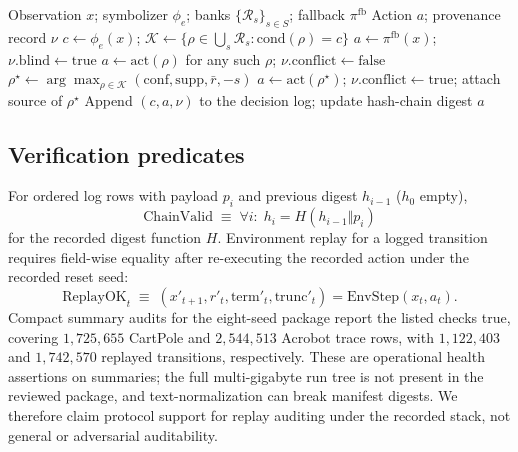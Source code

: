 \documentclass[11pt,a4paper]{article}
\begin{document}
\begin{algorithm}[t]
\caption{Rule-fusion decision at a state (academic symbols only)}
\label{alg:fusion}
\begin{algorithmic}[1]
\Require Observation \(x\); symbolizer \(\phi_e\); banks \(\{\mathcal{R}_s\}_{s\in S}\); fallback \(\pi^{\mathrm{fb}}\)
\Ensure Action \(a\); provenance record \(\nu\)
\State \(c\leftarrow\phi_e(x)\); \(\mathcal{K}\leftarrow\{\rho\in\bigcup_s\mathcal{R}_s:\mathrm{cond}(\rho)=c\}\)
  \State \(a\leftarrow\pi^{\mathrm{fb}}(x)\); \(\nu.\mathrm{blind}\leftarrow\mathrm{true}\)
  \State \(a\leftarrow\mathrm{act}(\rho)\) for any such \(\rho\); \(\nu.\mathrm{conflict}\leftarrow\mathrm{false}\)
\Else
  \State \(\rho^\star\leftarrow\arg\max_{\rho\in\mathcal{K}}(\mathrm{conf},\mathrm{supp},\bar r,-s)\)
  \State \(a\leftarrow\mathrm{act}(\rho^\star)\); \(\nu.\mathrm{conflict}\leftarrow\mathrm{true}\); attach source of \(\rho^\star\)
\EndIf
\State Append \((c,a,\nu)\) to the decision log; update hash-chain digest
\State \Return \(a\)
\end{algorithmic}
\end{algorithm}

\subsection{Verification predicates}
\label{sec:verify}

For ordered log rows with payload \(p_i\) and previous digest \(h_{i-1}\) (\(h_0\) empty),
\begin{equation}
\label{eq:chain}
\mathrm{ChainValid}
\;\equiv\;
\forall i:\; h_i=H(h_{i-1}\Vert p_i)
\end{equation}
for the recorded digest function \(H\).
Environment replay for a logged transition requires field-wise equality after re-executing the recorded action under the recorded reset seed:
\begin{equation}
\label{eq:replay}
\mathrm{ReplayOK}_t
\;\equiv\;
(x'_{t+1},r'_t,\mathrm{term}'_t,\mathrm{trunc}'_t)
=\mathrm{EnvStep}(x_t,a_t).
\end{equation}
Compact summary audits for the eight-seed package report the listed checks true, covering \(1{,}725{,}655\) CartPole and \(2{,}544{,}513\) Acrobot trace rows, with \(1{,}122{,}403\) and \(1{,}742{,}570\) replayed transitions, respectively.
These are operational health assertions on summaries; the full multi-gigabyte run tree is not present in the reviewed package, and text-normalization can break manifest digests.
We therefore claim protocol support for replay auditing under the recorded stack, not general or adversarial auditability.
\end{document}
